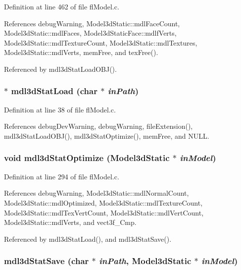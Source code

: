 Definition at line 462 of file fl\-Model.c.

References debug\-Warning, Model3d\-Static::mdl\-Face\-Count, Model3d\-Static::mdl\-Faces, Model3d\-Static\-Face::mdlf\-Verts, Model3d\-Static::mdl\-Texture\-Count, Model3d\-Static::mdl\-Textures, Model3d\-Static::mdl\-Verts, mem\-Free, and tex\-Free().

Referenced by mdl3d\-Stat\-Load\-OBJ().
\subsubsection{$\ast$ mdl3d\-Stat\-Load (char $\ast$ {\em in\-Path})}\label{flModel_8c_f1d48e04f0daa9248cb6b5fb6488a164}




Definition at line 38 of file fl\-Model.c.

References debug\-Dev\-Warning, debug\-Warning, file\-Extension(), mdl3d\-Stat\-Load\-OBJ(), mdl3d\-Stat\-Optimize(), mem\-Free, and NULL.
\subsubsection{\setlength{\rightskip}{0pt plus 5cm}void mdl3d\-Stat\-Optimize ({\bf Model3d\-Static} $\ast$ {\em in\-Model})}\label{flModel_8c_f4de6b2e261a216256748986384238a1}




Definition at line 294 of file fl\-Model.c.

References debug\-Warning, Model3d\-Static::mdl\-Normal\-Count, Model3d\-Static::mdl\-Optimized, Model3d\-Static::mdl\-Texture\-Count, Model3d\-Static::mdl\-Tex\-Vert\-Count, Model3d\-Static::mdl\-Vert\-Count, Model3d\-Static::mdl\-Verts, and vect3f\_\-Cmp.

Referenced by mdl3d\-Stat\-Load(), and mdl3d\-Stat\-Save().
\subsubsection{ mdl3d\-Stat\-Save (char $\ast$ {\em in\-Path}, {\bf Model3d\-Static} $\ast$ {\em in\-Model})}\label{flModel_8c_571078f0a72c08e3f00a191a07bbcb58}





